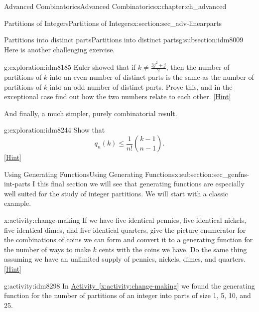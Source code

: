 \documentclass[oneside,10pt,]{book}
\numberwithin{equation}{chapter}
\begin{document}
\begin{chapterptx}{Advanced Combinatorics}{}{Advanced Combinatorics}{}{}{x:chapter:ch_advanced}
\begin{sectionptx}{Partitions of Integers}{}{Partitions of Integers}{}{}{x:section:sec_adv-linearparts}
\begin{subsectionptx}{Partitions into distinct parts}{}{Partitions into distinct parts}{}{}{g:subsection:idm8009}
Here is another challenging exercise.%
\begin{exploration}{}{g:exploration:idm8185}%
Euler showed that if \(k\not= \frac{3j^2+j}{2}\), then the number of partitions of \(k\) into an even number of distinct parts is the same as the number of partitions of \(k\) into an odd number of distinct parts. Prove this, and in the exceptional case find out how the two numbers relate to each other.%
\space\hspace*{0pt}\hfill{\tiny\hyperlink{g:hint:idm8191-back}{[Hint]}}\end{exploration}
And finally, a much simpler, purely combinatorial result.%
\begin{exploration}{}{g:exploration:idm8244}%
Show that%
\begin{equation*}
q_n(k) \le \frac{1}{n!}\binom{k-1}{n-1}.
\end{equation*}
%
\space\hspace*{0pt}\hfill{\tiny\hyperlink{g:hint:idm8248-back}{[Hint]}}\end{exploration}
\end{subsectionptx}
%
%
\typeout{************************************************}
\typeout{************************************************}
%
\begin{subsectionptx}{Using Generating Functions}{}{Using Generating Functions}{}{}{x:subsection:sec_genfns-int-parts}
I this final section we will see that generating functions are especially well suited for the study of integer partitions.  We will start with a classic example.%
\begin{activity}{}{x:activity:change-making}%
If we have five identical pennies, five identical nickels, five identical dimes, and five identical quarters, give the picture enumerator for the combinations of coins we can form and convert it to a generating function for the number of ways to make \(k\) cents with the coins we have. Do the same thing assuming we have an unlimited supply of pennies, nickels, dimes, and quarters.%
\space\hspace*{0pt}\hfill{\tiny\hyperlink{g:hint:idm8280-back}{[Hint]}}\end{activity}
\begin{activity}{}{g:activity:idm8298}%
In \hyperref[x:activity:change-making]{Activity~\ref{x:activity:change-making}} we found the generating function for the number of partitions of an integer into parts of size 1, 5, 10, and 25. %
\begin{enumerate}[font=\bfseries,label=(\alph*),ref=\alph*]

\end{enumerate}
\end{activity}
\end{subsectionptx}
\end{sectionptx}
\end{chapterptx}
\end{document}
